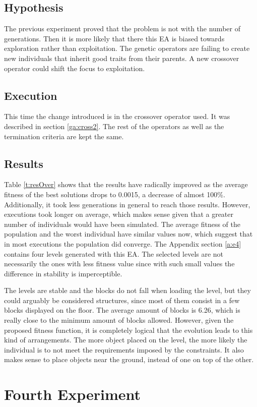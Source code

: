 \subsection{Hypothesis}
The previous experiment proved that the problem is not with the number of generations. Then it is more likely that there this \acs{EA} is biased towards exploration rather than exploitation. The genetic operators are failing to create new individuals that inherit good traits from their parents. A new crossover operator could shift the focus to exploitation.
\subsection{Execution}
This time the change introduced is in the crossover operator used. It was described in section \ref{ga:cross2}. The rest of the operators as well as the termination criteria are kept the same. 
\subsection{Results}
Table \ref{t:resOver} shows that the results have radically improved as the average fitness of the best solutions drops to 0.0015, a decrease of almost 100\%. Additionally, it took less generations in general to reach those results. However, executions took longer on average, which makes sense given that a greater number of individuals would have been simulated. The average fitness of the population and the worst individual have similar values now, which suggest that in most executions the population did converge. The Appendix section \ref{a:e4} contains four levels generated with this \acs{EA}. The selected levels are not necessarily the ones with less fitness value since with such small values the difference in stability is imperceptible.

The levels are stable and the blocks do not fall when loading the level, but they could arguably be considered structures, since most of them consist in a few blocks displayed on the floor. The average amount of blocks is 6.26, which is really close to the minimum amount of blocks allowed. However, given the proposed fitness function, it is completely logical that the evolution leads to this kind of arrangements. The more object placed on the level, the more likely the individual is to not meet the requirements imposed by the constraints. It also makes sense to place objects near the ground, instead of one on top of the other.
\section{Fourth Experiment}
